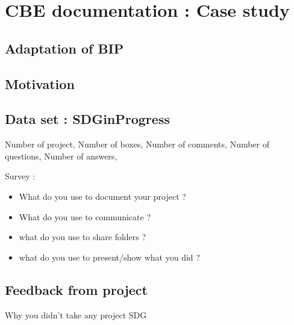 \chapter{CBE documentation : Case study}

\section{Adaptation of BIP}

\section{Motivation}

\section{Data set :  SDGinProgress}

Number of project, 
Number of boxes,
Number of comments,
Number of questions,
Number of answers,

Survey : 
\begin{itemize}
\item What do you use to document your project ?
\item What do you use to communicate ?
\item what do you use to share folders ?
\item what do you use to present/show what you did ?
\end{itemize}
\section{Feedback from project}

Why you didn't take any project SDG
